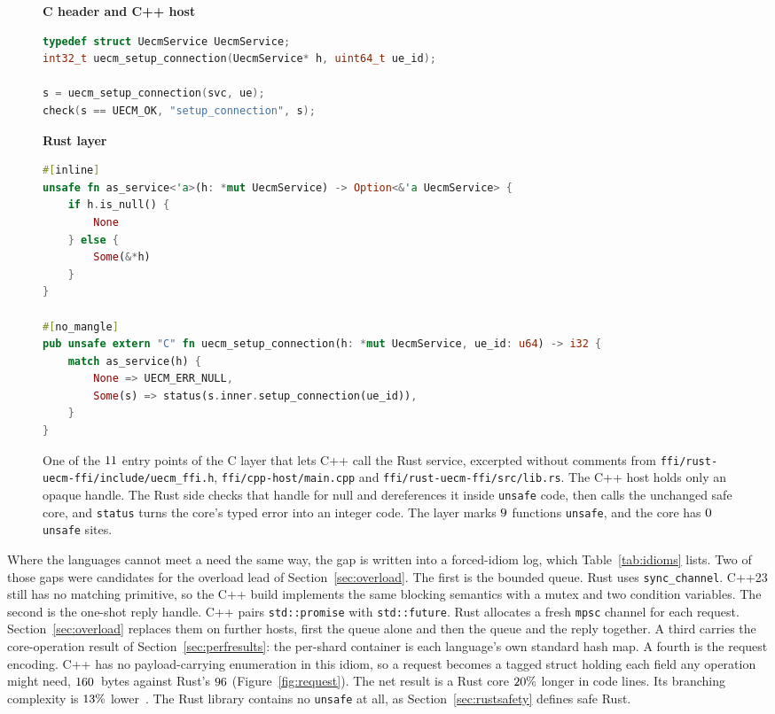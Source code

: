 \documentclass[english,oneside,a4paper,censored,csm,software-track-2020]{HYthesisML}
\begin{document}
\begin{figure}[!tbp]
\centering
\begin{minipage}{\linewidth}
{\footnotesize\textbf{C header and C++ host}}
\begin{lstlisting}[language=C++]
typedef struct UecmService UecmService;
int32_t uecm_setup_connection(UecmService* h, uint64_t ue_id);

s = uecm_setup_connection(svc, ue);
check(s == UECM_OK, "setup_connection", s);
\end{lstlisting}
{\footnotesize\textbf{Rust layer}}
\begin{lstlisting}[language=Rust]
#[inline]
unsafe fn as_service<'a>(h: *mut UecmService) -> Option<&'a UecmService> {
    if h.is_null() {
        None
    } else {
        Some(&*h)
    }
}

#[no_mangle]
pub unsafe extern "C" fn uecm_setup_connection(h: *mut UecmService, ue_id: u64) -> i32 {
    match as_service(h) {
        None => UECM_ERR_NULL,
        Some(s) => status(s.inner.setup_connection(ue_id)),
    }
}
\end{lstlisting}
\end{minipage}
\caption[One entry point of the C layer]{One of the $11$ entry
points of the C layer that lets C++ call the Rust service, excerpted without
comments from \texttt{ffi/rust-uecm-ffi/include/uecm\_ffi.h},
\texttt{ffi/cpp-host/main.cpp} and \texttt{ffi/rust-uecm-ffi/src/lib.rs}. The C++ host holds only an opaque handle.
The Rust side checks that handle for null and dereferences it inside
\texttt{unsafe} code, then calls the unchanged safe core, and \texttt{status}
turns the core's typed error into an integer code. The layer marks
$9$ functions \texttt{unsafe}, and the core has $0$
\texttt{unsafe} sites.\label{fig:ffilisting}}
\end{figure}

Where the languages cannot meet a need the same way, the gap is written into a
forced-idiom log, which Table~\ref{tab:idioms} lists. Two of those gaps were candidates for the
overload lead of Section~\ref{sec:overload}. The first is the bounded queue.
Rust uses \texttt{sync\_channel}. C++23 still has no matching primitive, so the
C++ build implements the same blocking semantics with a mutex and two condition
variables. The second is the one-shot reply handle. C++ pairs
\texttt{std::promise} with \texttt{std::future}. Rust allocates a fresh
\texttt{mpsc} channel for each request. Section~\ref{sec:overload} replaces
them on further hosts, first the queue alone and then the queue and the reply
together. A third carries the core-operation result of Section~\ref{sec:perfresults}: the
per-shard container is each language's own standard hash map. A fourth is the
request encoding. C++ has no payload-carrying enumeration in this idiom, so a
request becomes a tagged struct holding each field any operation might need,
$160$~bytes against Rust's $96$
(Figure~\ref{fig:request}). The net result is
a Rust core $20\%$ longer in code lines. Its branching complexity is
$13\%$ lower~\cite{lizard}. The Rust library contains no
\texttt{unsafe} at all, as Section~\ref{sec:rustsafety} defines safe Rust.
\end{document}
